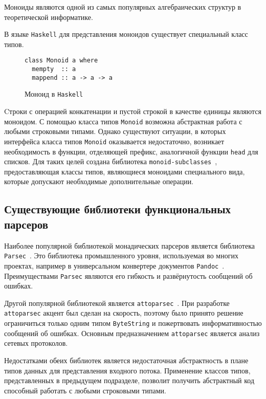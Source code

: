 Моноиды являются одной из самых популярных алгебраических структур в теоретической информатике.

В языке \lstinline{Haskell} для представления моноидов существует специальный класс типов.

\begin{figure}[h]
\begin{lstlisting}
class Monoid a where
  mempty  :: a
  mappend :: a -> a -> a
\end{lstlisting}
\caption{Моноид в \lstinline{Haskell}}
\label{listing:Monoid}
\end{figure}

Cтроки с операцией конкатенации и пустой строкой в качестве единицы являются моноидом. С помощью класса типов \lstinline{Monoid} возможна абстрактная работа с любыми строковыми типами. Однако существуют ситуации, в которых интерфейса класса типов \lstinline{Monoid} оказывается недостаточно, возникает необходимость в функции, отделяющей префикс, аналогичной функции \lstinline{head} для списков. Для таких целей создана библиотека \lstinline{monoid-subclasses}~\autocite{MonoidSubclasses}, предоставляющая классы типов, являющиеся моноидами специального вида, которые допускают необходимые дополнительные операции.

\subsection{Существующие библиотеки функциональных парсеров}

Наиболее популярной библиотекой монадических парсеров является библиотека \lstinline{Parsec}~\autocite{Parsec}. Это библиотека промышленного уровня, используемая во многих проектах, например в универсальном конвертере документов \lstinline{Pandoc}~\autocite{Pandoc}. Преимуществами \lstinline{Parsec} являются его гибкость и развёрнутость сообщений об ошибках.

Другой популярной библиотекой является \lstinline{attoparsec}~\autocite{Attoparsec}. При разработке \lstinline{attoparsec} акцент был сделан на скорость, поэтому было принято решение ограничиться только одним типом \lstinline{ByteString} и пожертвовать информативностью сообщений об ошибках. Основным предназначением \lstinline{attoparsec} является анализ сетевых протоколов.

Недостатками обеих библиотек является недостаточная абстрактность в плане типов данных для представления входного потока. Применение классов типов, представленных в предыдущем подразделе, позволит получить абстрактный код способный работать с любыми строковыми типами.   

